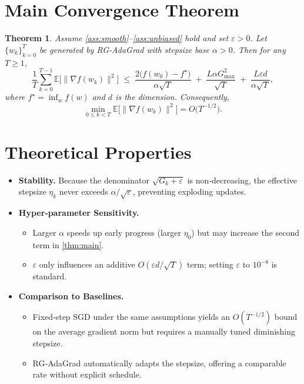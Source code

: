 \documentclass[11pt]{article}
\newtheorem{theorem}{Theorem}
\newcommand{\E}{\mathbb{E}}
\begin{document}
\section*{Main Convergence Theorem}
\begin{theorem}\label{thm:main}
Assume \ref{ass:smooth}–\ref{ass:unbiased} hold and set $\varepsilon>0$.
Let $\{w_{k}\}_{k=0}^{T}$ be generated by RG‑AdaGrad with stepsize base
$\alpha>0$. Then for any $T\ge1$,
\[
\frac{1}{T}\sum_{k=0}^{T-1}\E\!\bigl[\|\nabla f(w_{k})\|^{2}\bigr]
\;\le\;
\frac{2\bigl(f(w_{0})-f^{\star}\bigr)}{\alpha\sqrt{T}}
\;+\;
\frac{L\alpha G_{\max}^{2}}{\sqrt{T}}
\;+\;
\frac{L\varepsilon d}{\alpha\sqrt{T}},
\tag{2}
\]
where $f^{\star}=\inf_{w}f(w)$ and $d$ is the dimension.
Consequently,
\[
\min_{0\le k<T}\E\!\bigl[\|\nabla f(w_{k})\|^{2}\bigr]
=O\!\bigl(T^{-1/2}\bigr).
\]
\end{theorem}

\section*{Theoretical Properties}
\begin{itemize}
\item \textbf{Stability.} Because the denominator $\sqrt{G_{k}+\varepsilon}$ is non‑decreasing,
the effective stepsize $\eta_{k}$ never exceeds $\alpha/\sqrt{\varepsilon}$,
preventing exploding updates.
\item \textbf{Hyper‑parameter Sensitivity.}
  \begin{itemize}
    \item Larger $\alpha$ speeds up early progress (larger $\eta_{0}$) but may increase the second term in \eqref{thm:main}.
    \item $\varepsilon$ only influences an additive $O(\varepsilon d/\sqrt{T})$ term; setting $\varepsilon$ to $10^{-8}$ is standard.
  \end{itemize}
\item \textbf{Comparison to Baselines.}
  \begin{itemize}
    \item Fixed‑step SGD under the same assumptions yields an $O(T^{-1/2})$ bound on the average gradient norm but requires a manually tuned diminishing stepsize.
    \item RG‑AdaGrad automatically adapts the stepsize, offering a comparable rate without explicit schedule.
  \end{itemize}
\end{itemize}
\end{document}

